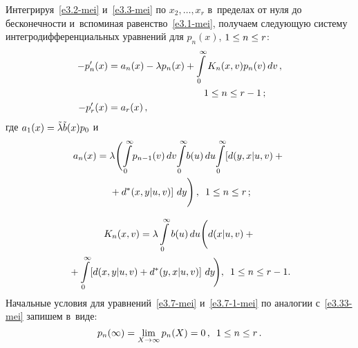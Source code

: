 \begin{multicols}{2}
Интегрируя~\eqref{e3.2-mei} и~\eqref{e3.3-mei} по
$x_2,\ldots ,x_r$ в~пределах от нуля до бесконечности и~вспоминая равенство~\eqref{e3.1-mei}, 
получаем следующую систему интегродифференциальных уравнений
для $p_{n}(x)$, $1 \hm\le n \hm\le r$:
\begin{align}
-p'_{n}(x) &= a_n(x) - \lambda p_{n}(x) +
\int\limits_0^\infty K_n(x,v) p_{n}(v)\,dv \,,\notag\\ 
&\hspace*{35mm}1  \le n \le r-1\,; \label{e3.7-mei}\\
-p'_{r}(x) &= a_r(x)\,,  \label{e3.7-1-mei}
\end{align}
где $a_1(x)=\tilde\lambda \tilde b(x) p_0$ и
\begin{multline*}
a_{n}(x) = \lambda \Bigg( \!\int\limits_0^\infty\!
p_{n-1}(v)\,dv \! \int\limits_0^\infty\!
b(u)\,du \!\int\limits_0^\infty\!
\left[d(y,x|u,v) +{}\right.\\
\left.{}+ d^*(x,y|u,v)\right] \,dy
\Bigg)\,,\enskip 1 \le n \le r\,;
\end{multline*}

\vspace*{-12pt}

\noindent
\begin{multline*}
K_n(x,v) = \lambda \int\limits_0^\infty b(u)\,du
\Bigg( d(x|u,v) +{}\\
{}+
\int\limits_0^\infty \!\left[d(x,y|u,v) + d^*(y,x|u,v)\right]
\,dy\! \Bigg),
\enskip 1 \le n \le r-1.
\end{multline*}
Начальные условия для уравнений~\eqref{e3.7-mei} и~\eqref{e3.7-1-mei}
по аналогии с~\eqref{e3.33-mei} запишем в~виде:
\begin{equation}
\label{e3.8-mei}
p_{n}(\infty) = \lim\limits_{X\to \infty} p_{n}(X)
= 0 \,,\enskip 1 \le n \le r\,. 
\end{equation}



\end{multicols}
